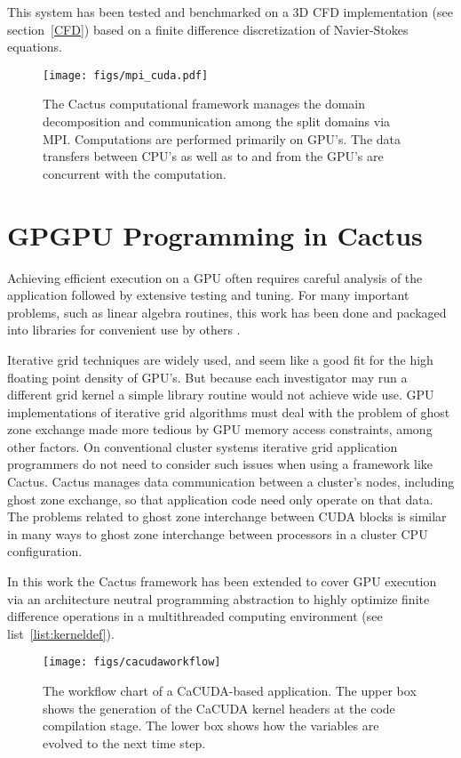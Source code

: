 \documentclass{IOS-Book-Article}
\begin{document}
This system has been tested and benchmarked on a 3D CFD implementation
(see section~\ref{CFD})
based on a finite difference discretization of Navier-Stokes equations.
\begin{figure}[htp]
  \centering
  \texttt{[image: figs/mpi\_cuda.pdf]}
  \caption{The Cactus computational framework manages the domain
    decomposition and 
    communication among the split domains via MPI\@. Computations are
    performed primarily on GPU's.
    The data transfers between CPU's as well as to and from the GPU's
    are concurrent with the computation.}
  \label{fig:mpicuda}
\end{figure}

\section{GPGPU Programming in Cactus}
Achieving efficient execution on a GPU often requires careful analysis
of the application followed by extensive testing and tuning. For many
important problems, such as linear algebra routines, this work has been
done and packaged into libraries for convenient use by others \cite{volkov08}.

Iterative grid techniques are widely used, and seem like a good fit
for the high floating point density of GPU's. But because each investigator
may run a different grid kernel a simple library routine would not
achieve wide use. GPU implementations of iterative grid algorithms
must deal with the problem of ghost zone exchange made more tedious by
GPU memory access constraints, among other factors.
On conventional cluster systems iterative grid application programmers
do not need to consider such issues when using a framework like
Cactus. Cactus manages data communication between a cluster's nodes,
including ghost zone exchange, so that application code need only
operate on that data. The problems related to ghost zone interchange
between CUDA blocks is similar in many ways to ghost zone interchange
between processors in a cluster CPU configuration.

In this work the Cactus framework has been extended to
cover GPU execution via an architecture neutral programming abstraction
to highly optimize finite difference operations in a multithreaded
computing environment (see list~\ref{list:kerneldef}).


\begin{figure}[htp]
  \centering
  \texttt{[image: figs/cacudaworkflow]}
  \caption{The workflow chart of a CaCUDA-based application. The upper box 
  shows the generation of the CaCUDA kernel headers at the code compilation stage. 
  The lower box shows how the variables are evolved to the next time step. }
  \label{fig:cacudaworkflow}
\end{figure}
\end{document}
